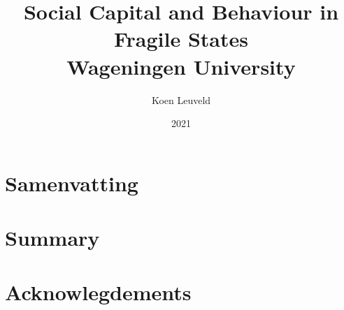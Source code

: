 



\title{
	{Social Capital and Behaviour in Fragile States}\\
	{\large Wageningen University}\\
}
\author{Koen Leuveld}
\date{2021}

\maketitle
\tableofcontents
\todototoc
\listoftodos

 






\clearpage
{}
\chapter*{Samenvatting}


\clearpage
{}
\chapter*{Summary}


\chapter*{Acknowlegdements}








